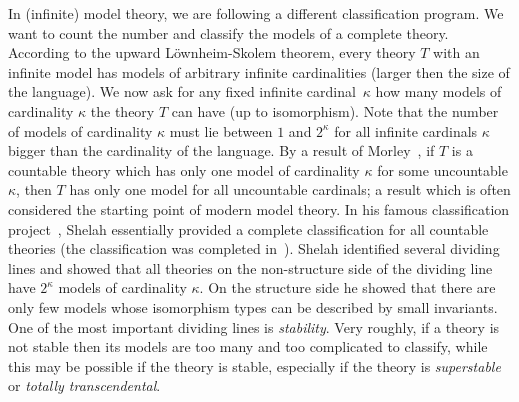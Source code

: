 \smallskip

In (infinite) model theory, we are following a different classification program. We 
want to count the number and classify the models of a complete theory. According
to the upward L\"ownheim-Skolem theorem, every theory $T$ with an infinite model has
models of arbitrary infinite cardinalities (larger then the size of the language). We 
now ask for any fixed infinite cardinal~$\kappa$ how many models of cardinality 
$\kappa$ the theory $T$ can have (up to isomorphism). Note that the number of
models of cardinality $\kappa$ must lie between $1$ and $2^\kappa$ for all infinite cardinals $\kappa$ 
bigger than the cardinality of the language. By a result of 
Morley~\cite{morley1965categoricity}, if $T$ is a countable
theory which has only one model of cardinality $\kappa$ for some uncountable $\kappa$, 
then $T$ has only one model for all uncountable cardinals; a result which 
is often considered the starting point of modern model theory. In his famous classification
project~\cite{shelah1990classification}, Shelah essentially provided a complete
classification for all countable theories (the classification was completed 
in~\cite{hart2000uncountable}). Shelah identified several dividing lines and showed that
all theories on the non-structure side of the dividing line have $2^\kappa$ models
of cardinality $\kappa$. On
the structure side he showed that there are only few models whose isomorphism 
types can be described by small invariants. One of the most important dividing 
lines is \emph{stability}. Very roughly, if a theory is not stable then its models 
are too many and too complicated to classify, while this may be possible if the theory is stable, 
especially if the theory is \emph{superstable} or \emph{totally transcendental}.


